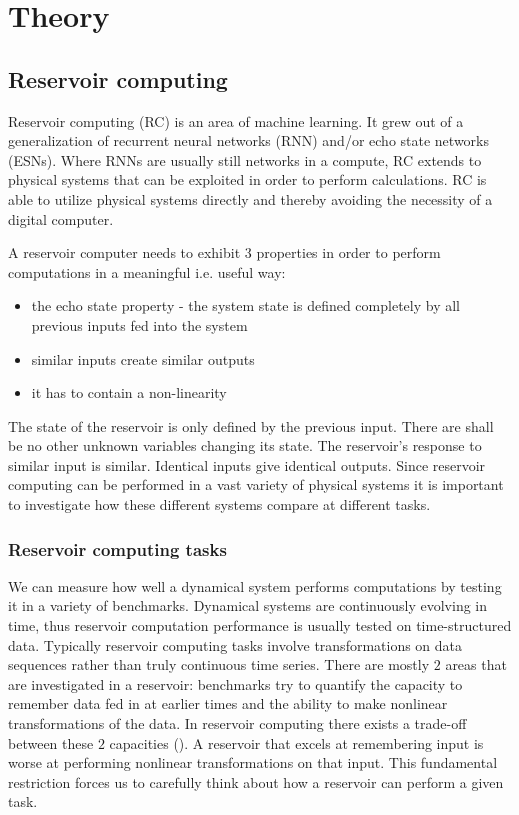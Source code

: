 \section{Theory}

\subsection{Reservoir computing}

Reservoir computing (RC) is an area of machine learning. It grew out of a generalization of recurrent neural networks (RNN) and/or echo state networks (ESNs). Where RNNs are usually still networks in a compute, RC extends to physical systems that can be exploited in order to perform calculations. RC is able to utilize physical systems directly and thereby avoiding the necessity of a digital computer. 

A reservoir computer needs to exhibit $3$ properties in order to perform computations in a meaningful i.e. useful way:

	\begin{itemize}
		\item the echo state property - the system state is defined completely by all previous inputs fed into the system
		\item similar inputs create similar outputs 
		\item it has to contain a non-linearity
	\end{itemize}

The state of the reservoir is only defined by the previous input. There are shall be no other unknown variables changing its state. The reservoir's response to similar input is similar. Identical inputs give identical outputs.
Since reservoir computing can be performed in a vast variety of physical systems it is important to investigate how these different systems compare at different tasks. 

\begin{figure}
\end{figure}


\subsubsection{Reservoir computing tasks}

We can measure how well a dynamical system performs computations by testing it in a variety of benchmarks. Dynamical systems are continuously evolving in time, thus reservoir computation performance is usually tested on time-structured data. Typically reservoir computing tasks involve transformations on data sequences rather than truly continuous time series. There are mostly $2$ areas that are investigated in a reservoir: benchmarks try to quantify the capacity to remember data fed in at earlier times and the ability to make nonlinear transformations of the data. In reservoir computing there exists a trade-off between these $2$ capacities (\cite{DAM12}). A reservoir that excels at remembering input is worse at performing nonlinear transformations on that input. This fundamental restriction forces us to carefully think about how a reservoir can perform a given task.  \\

